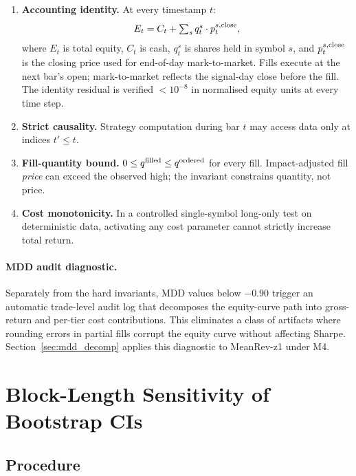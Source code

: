 \documentclass[12pt]{article}
\begin{document}
\begin{enumerate}[label=(\roman*), nosep]
  \item \textbf{Accounting identity.} At every timestamp $t$:
    \begin{equation}
      E_t = C_t + \textstyle\sum_{s} q^s_t \cdot p^{s,\rm close}_t,
      \label{eq:accounting}
    \end{equation}
    where $E_t$ is total equity, $C_t$ is cash, $q^s_t$ is shares held
    in symbol $s$, and $p^{s,\rm close}_t$ is the closing price used for
    end-of-day mark-to-market. Fills execute at the next bar's open;
    mark-to-market reflects the signal-day close before the fill.
    The identity residual is verified $< 10^{-8}$ in normalised equity
    units at every time step.

  \item \textbf{Strict causality.} Strategy computation during bar $t$
    may access data only at indices $t' \le t$.

  \item \textbf{Fill-quantity bound.}
    $0 \le q^{\rm filled} \le q^{\rm ordered}$ for every fill.
    Impact-adjusted fill \emph{price} can exceed the observed high;
    the invariant constrains quantity, not price.

  \item \textbf{Cost monotonicity.} In a controlled single-symbol
    long-only test on deterministic data, activating any cost parameter
    cannot strictly increase total return.
\end{enumerate}

\paragraph{MDD audit diagnostic.}
Separately from the hard invariants, MDD values below $-0.90$ trigger
an automatic trade-level audit log that decomposes the equity-curve path
into gross-return and per-tier cost contributions. This eliminates a
class of artifacts where rounding errors in partial fills corrupt the
equity curve without affecting Sharpe. Section~\ref{sec:mdd_decomp}
applies this diagnostic to MeanRev-z1 under M4.

\section{Block-Length Sensitivity of Bootstrap CIs}
\label{app:bootstrap_sensitivity}

\subsection{Procedure}
\end{document}
